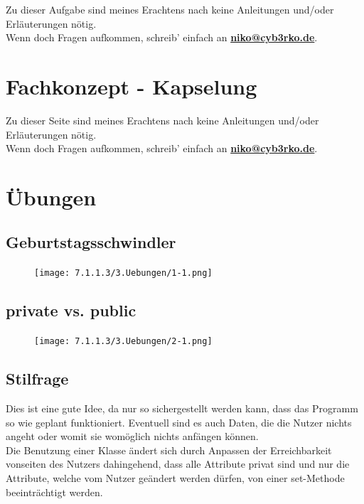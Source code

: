 \documentclass{scrartcl}   %
\begin{document}
Zu dieser Aufgabe sind meines Erachtens nach keine Anleitungen und/oder Erläuterungen nötig.\\
Wenn doch Fragen aufkommen, schreib' einfach an \textbf{\href{mailto:niko@cyb3rko.de}{niko@cyb3rko.de}}.

\newpage

\section{Fachkonzept - Kapselung}

Zu dieser Seite sind meines Erachtens nach keine Anleitungen und/oder Erläuterungen nötig.\\
Wenn doch Fragen aufkommen, schreib' einfach an \textbf{\href{mailto:niko@cyb3rko.de}{niko@cyb3rko.de}}.

\newpage

\section{Übungen}

\subsection{Geburtstagsschwindler}

\begin{figure}[!h]
	\centering
	\texttt{[image: 7.1.1.3/3.Uebungen/1-1.png]}
\end{figure}

\subsection{private vs. public}

\begin{figure}[!h]
	\centering
	\texttt{[image: 7.1.1.3/3.Uebungen/2-1.png]}
\end{figure}

\newpage

\subsection{Stilfrage}

Dies ist eine gute Idee, da nur so sichergestellt werden kann, dass das Programm so wie geplant funktioniert. Eventuell sind es auch Daten, die die Nutzer nichts angeht oder womit sie womöglich nichts anfängen können.\\
Die Benutzung einer Klasse ändert sich durch Anpassen der Erreichbarkeit vonseiten des Nutzers dahingehend, dass alle Attribute privat sind und nur die Attribute, welche vom Nutzer geändert werden dürfen, von einer set-Methode beeinträchtigt werden.
\end{document}
